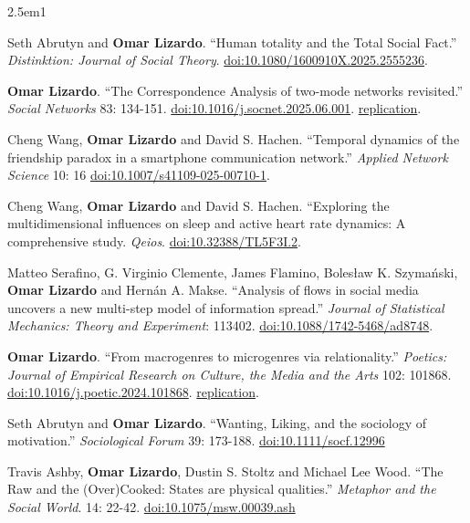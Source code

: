 \documentclass[
]{article}
\newenvironment{cventry}{\begin{hangparas}{2.5em}{1}}{\end{hangparas}}
\begin{document}
\begin{cventry}

Seth Abrutyn and \textbf{Omar Lizardo}. ``Human totality and the Total
Social Fact.'' \emph{Distinktion: Journal of Social Theory}.
\href{https://doi.org/10.1080/1600910X.2025.2555236}{doi:10.1080/1600910X.2025.2555236}.

\textbf{Omar Lizardo}. ``The Correspondence Analysis of two-mode
networks revisited.'' \emph{Social Networks} 83: 134-151.
\href{https://doi.org/10.1016/j.socnet.2025.06.001}{doi:10.1016/j.socnet.2025.06.001}.
\href{https://github.com/olizardo/correspondence-analysis-two-mode-networks}{
replication}.

Cheng Wang, \textbf{Omar Lizardo} and David S. Hachen. ``Temporal
dynamics of the friendship paradox in a smartphone communication
network.'' \emph{Applied Network Science} 10: 16
\href{https://doi.org/10.1007/s41109-025-00710-1}{doi:10.1007/s41109-025-00710-1}.

Cheng Wang, \textbf{Omar Lizardo} and David S. Hachen. ``Exploring the
multidimensional influences on sleep and active heart rate dynamics: A
comprehensive study. \emph{Qeios}.
\href{https://doi.org/10.32388/TL5F3I.2}{doi:10.32388/TL5F3I.2}.

Matteo Serafino, G. Virginio Clemente, James Flamino, Bolesław K.
Szymański, \textbf{Omar Lizardo} and Hernán A. Makse. ``Analysis of
flows in social media uncovers a new multi-step model of information
spread.'' \emph{Journal of Statistical Mechanics: Theory and
Experiment}: 113402.
\href{https://doi.org/10.1088/1742-5468/ad8748}{doi:10.1088/1742-5468/ad8748}.

\textbf{Omar Lizardo}. ``From macrogenres to microgenres via
relationality.'' \emph{Poetics: Journal of Empirical Research on
Culture, the Media and the Arts} 102: 101868.
\href{https://doi.org/10.1016/j.poetic.2024.101868}{doi:10.1016/j.poetic.2024.101868}.
\href{https://github.com/olizardo/Discovering-Focused-Microgenre-Communities}{
replication}.

Seth Abrutyn and \textbf{Omar Lizardo}. ``Wanting, Liking, and the
sociology of motivation.'' \emph{Sociological Forum} 39: 173-188.
\href{https://doi.org/10.1111/socf.12996}{doi:10.1111/socf.12996}

Travis Ashby, \textbf{Omar Lizardo}, Dustin S. Stoltz and Michael Lee
Wood. ``The Raw and the (Over)Cooked: States are physical qualities.''
\emph{Metaphor and the Social World}. 14: 22-42.
\href{https://doi.org/10.1075/msw.00039.ash}{doi:10.1075/msw.00039.ash}


\end{cventry}
\end{document}
